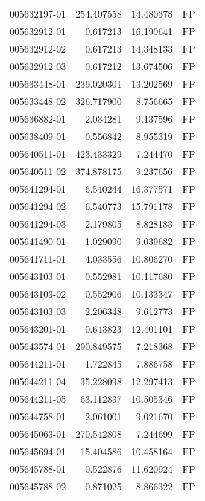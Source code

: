 \begin{tabular}{lrrl}
005632197-01 &  254.407558 &      14.480378 &   FP \\
005632912-01 &    0.617213 &      16.190641 &   FP \\
005632912-02 &    0.617213 &      14.348133 &   FP \\
005632912-03 &    0.617212 &      13.674506 &   FP \\
005633448-01 &  239.020301 &      13.202569 &   FP \\
005633448-02 &  326.717900 &       8.756665 &   FP \\
005636882-01 &    2.034281 &       9.137596 &   FP \\
005638409-01 &    0.556842 &       8.955319 &   FP \\
005640511-01 &  423.433329 &       7.244470 &   FP \\
005640511-02 &  374.878175 &       9.237656 &   FP \\
005641294-01 &    6.540244 &      16.377571 &   FP \\
005641294-02 &    6.540773 &      15.791178 &   FP \\
005641294-03 &    2.179805 &       8.828183 &   FP \\
005641490-01 &    1.029090 &       9.039682 &   FP \\
005641711-01 &    4.033556 &      10.806270 &   FP \\
005643103-01 &    0.552981 &      10.117680 &   FP \\
005643103-02 &    0.552906 &      10.133347 &   FP \\
005643103-03 &    2.206348 &       9.612773 &   FP \\
005643201-01 &    0.643823 &      12.401101 &   FP \\
005643574-01 &  290.849575 &       7.218368 &   FP \\
005644211-01 &    1.722845 &       7.886758 &   FP \\
005644211-04 &   35.228098 &      12.297413 &   FP \\
005644211-05 &   63.112837 &      10.505346 &   FP \\
005644758-01 &    2.061001 &       9.021670 &   FP \\
005645063-01 &  270.542808 &       7.244699 &   FP \\
005645694-01 &   15.404586 &      10.458164 &   FP \\
005645788-01 &    0.522876 &      11.620924 &   FP \\
005645788-02 &    0.871025 &       8.866322 &   FP \\

\end{tabular}
